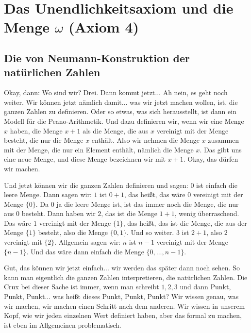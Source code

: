 \section{Das Unendlichkeitsaxiom und die Menge \texorpdfstring{$\omega$}{omega} (Axiom 4)}

\subsection{Die von Neumann-Konstruktion der natürlichen Zahlen}
\begin{spoken-clean}[continued]
Okay, dann: Wo sind wir? Drei. Dann kommt jetzt... Ah nein, es geht noch weiter. Wir können jetzt nämlich damit... was wir jetzt machen wollen, ist, die ganzen Zahlen zu definieren. Oder so etwas, was sich herausstellt, ist dann ein Modell für die Peano-Arithmetik. Und dazu definieren wir, wenn wir eine Menge $x$ haben, die Menge $x + 1$ als die Menge, die aus $x$ vereinigt mit der Menge besteht, die nur die Menge $x$ enthält. Also wir nehmen die Menge $x$ zusammen mit der Menge, die nur ein Element enthält, nämlich die Menge $x$. Das gibt uns eine neue Menge, und diese Menge bezeichnen wir mit $x + 1$. Okay, das dürfen wir machen.

Und jetzt können wir die ganzen Zahlen definieren und sagen: $0$ ist einfach die leere Menge. Dann sagen wir: $1$ ist $0 + 1$, das heißt, das wäre $0$ vereinigt mit der Menge $\{0\}$. Da $0$ ja die leere Menge ist, ist das immer noch die Menge, die nur aus $0$ besteht. Dann haben wir $2$, das ist die Menge $1 + 1$, wenig überraschend. Das wäre $1$ vereinigt mit der Menge $\{1\}$, das heißt, das ist die Menge, die aus der Menge $\{1\}$ besteht, also die Menge $\{0, 1\}$. Und so weiter. $3$ ist $2 + 1$, also $2$ vereinigt mit $\{2\}$. Allgemein sagen wir: $n$ ist $n-1$ vereinigt mit der Menge $\{n-1\}$. Und das wäre dann einfach die Menge $\{0, \dots, n-1\}$.

Gut, das können wir jetzt einfach... wir werden das später dann noch sehen. So kann man eigentlich die ganzen Zahlen interpretieren, die natürlichen Zahlen. Die Crux bei dieser Sache ist immer, wenn man schreibt $1, 2, 3$ und dann Punkt, Punkt, Punkt... was heißt dieses Punkt, Punkt, Punkt? Wir wissen genau, was wir machen, wir machen einen Schritt nach dem anderen. Wir wissen in unserem Kopf, wie wir jeden einzelnen Wert definiert haben, aber das formal zu machen, ist eben im Allgemeinen problematisch. 
\end{spoken-clean}

